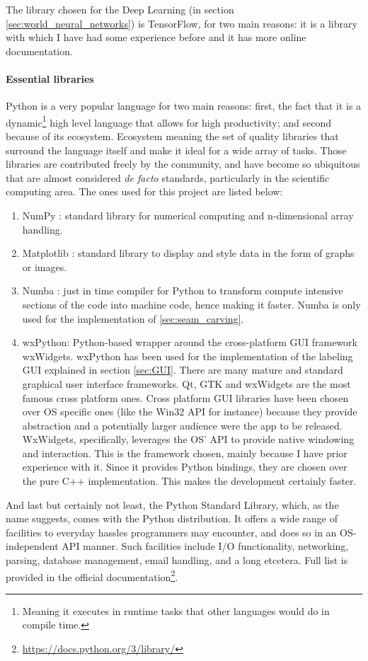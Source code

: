 \documentclass[../main.tex]{subfiles}
\begin{document}
The library chosen for the Deep Learning (in section \ref{sec:world_neural_networks}) is TensorFlow, for two main reasons: it is a library with which I have had some experience before and it has more online documentation.

\paragraph{Essential libraries} 
Python is a very popular language for two main reasons: first, the fact that it is a dynamic\footnote{Meaning it executes in runtime tasks that other languages would do in compile time.} high level language that allows for high productivity; and second because of its ecosystem. Ecosystem meaning the set of quality libraries that surround the language itself and make it ideal for a wide array of tasks. Those libraries are contributed freely by the community, and have become so ubiquitous that are almost considered \emph{de facto} standards, particularly in the scientific computing area. The ones used for this project are listed below:
\begin{enumerate}
    \item NumPy \cite{harris2020array}: standard library for numerical computing and n-dimensional array handling.
    \item Matplotlib \cite{matplotlib_paper}: standard library to display and style data in the form of graphs or images.
    \item Numba \cite{numba_paper}: just in time compiler for Python to transform compute intensive sections of the code into machine code, hence making it faster. Numba is only used for the implementation of \ref{sec:seam_carving}.
    \item wxPython: Python-based wrapper around the cross-platform GUI framework wxWidgets. wxPython has been used for the implementation of the labeling GUI explained in section \ref{sec:GUI}. There are many mature and standard graphical user interface frameworks. Qt, GTK and wxWidgets are the most famous cross platform ones. Cross platform GUI libraries have been chosen over OS specific ones (like the Win32 API for instance) because they provide abstraction and a potentially larger audience were the app to be released. WxWidgets, specifically, leverages the OS’ API to provide native windowing and interaction. This is the framework chosen, mainly because I have prior experience with it. Since it provides Python bindings, they are chosen over the pure C++ implementation. This makes the development certainly faster.
\end{enumerate}

And last but certainly not least, the Python Standard Library, which, as the name suggests, comes with the Python distribution. It offers a wide range of facilities to everyday hassles programmers may encounter, and does so in an OS-independent API manner. Such facilities include I/O functionality, networking, parsing, database management, email handling, and a long etcetera. Full list is provided in the official documentation\footnote{\url{https://docs.python.org/3/library/}}.

 
\end{document}
